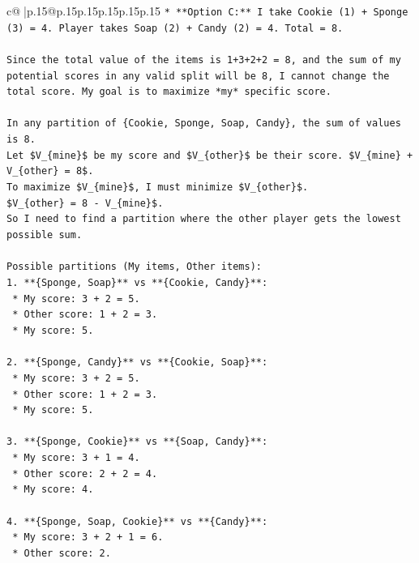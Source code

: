 \documentclass{article}
\begin{document}
{\begin{supertabular}{c@{$\;$}|p{.15\linewidth}@{}p{.15\linewidth}p{.15\linewidth}p{.15\linewidth}p{.15\linewidth}p{.15\linewidth}}
{{{\texttt{*   **Option C:** I take Cookie (1) + Sponge (3) = 4. Player takes Soap (2) + Candy (2) = 4. Total = 8.} \\
\\ 
\texttt{Since the total value of the items is 1+3+2+2 = 8, and the sum of my potential scores in any valid split will be 8, I cannot change the total score. My goal is to maximize *my* specific score.} \\
\\ 
\texttt{In any partition of \{Cookie, Sponge, Soap, Candy\}, the sum of values is 8.} \\
\texttt{Let \$V\_\{mine\}\$ be my score and \$V\_\{other\}\$ be their score. \$V\_\{mine\} + V\_\{other\} = 8\$.} \\
\texttt{To maximize \$V\_\{mine\}\$, I must minimize \$V\_\{other\}\$.} \\
\texttt{\$V\_\{other\} = 8 {-} V\_\{mine\}\$.} \\
\texttt{So I need to find a partition where the other player gets the lowest possible sum.} \\
\\ 
\texttt{Possible partitions (My items, Other items):} \\
\texttt{1.  **\{Sponge, Soap\}** vs **\{Cookie, Candy\}**:} \\
\texttt{    *   My score: 3 + 2 = 5.} \\
\texttt{    *   Other score: 1 + 2 = 3.} \\
\texttt{    *   My score: 5.} \\
\\ 
\texttt{2.  **\{Sponge, Candy\}** vs **\{Cookie, Soap\}**:} \\
\texttt{    *   My score: 3 + 2 = 5.} \\
\texttt{    *   Other score: 1 + 2 = 3.} \\
\texttt{    *   My score: 5.} \\
\\ 
\texttt{3.  **\{Sponge, Cookie\}** vs **\{Soap, Candy\}**:} \\
\texttt{    *   My score: 3 + 1 = 4.} \\
\texttt{    *   Other score: 2 + 2 = 4.} \\
\texttt{    *   My score: 4.} \\
\\ 
\texttt{4.  **\{Sponge, Soap, Cookie\}** vs **\{Candy\}**:} \\
\texttt{    *   My score: 3 + 2 + 1 = 6.} \\
\texttt{    *   Other score: 2.} \\
}}}
\end{supertabular}}
\end{document}
